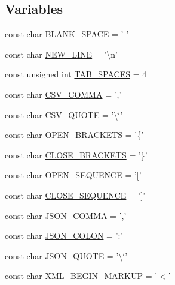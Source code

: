 \subsection*{Variables}
\begin{DoxyCompactItemize}
\item 
const char \hyperlink{namespaceit_1_1testbench_1_1formatter_ae17ec1f53b5ddc40060d493f7d744664}{B\-L\-A\-N\-K\-\_\-\-S\-P\-A\-C\-E} = ' '
\item 
const char \hyperlink{namespaceit_1_1testbench_1_1formatter_a21de1048d5a464b38faa63ba4a94633b}{N\-E\-W\-\_\-\-L\-I\-N\-E} = '\textbackslash{}n'
\item 
const unsigned int \hyperlink{namespaceit_1_1testbench_1_1formatter_a64f8c93e071db6e89ba0c16de961589b}{T\-A\-B\-\_\-\-S\-P\-A\-C\-E\-S} = 4
\item 
const char \hyperlink{namespaceit_1_1testbench_1_1formatter_ada9f2a5b063dec4362e8945321acdb49}{C\-S\-V\-\_\-\-C\-O\-M\-M\-A} = ','
\item 
const char \hyperlink{namespaceit_1_1testbench_1_1formatter_a8bfa4278b48cc7a4296d6888166e1b55}{C\-S\-V\-\_\-\-Q\-U\-O\-T\-E} = '\textbackslash{}\char`\"{}'
\item 
const char \hyperlink{namespaceit_1_1testbench_1_1formatter_aea7cf265be96bf2a6768f75a679b9d2f}{O\-P\-E\-N\-\_\-\-B\-R\-A\-C\-K\-E\-T\-S} = '\{'
\item 
const char \hyperlink{namespaceit_1_1testbench_1_1formatter_a3c0d3e9ddb3ebc20b410ea614a1d6668}{C\-L\-O\-S\-E\-\_\-\-B\-R\-A\-C\-K\-E\-T\-S} = '\}'
\item 
const char \hyperlink{namespaceit_1_1testbench_1_1formatter_a5fce6f0b6a7d8b553fa581680e59b039}{O\-P\-E\-N\-\_\-\-S\-E\-Q\-U\-E\-N\-C\-E} = '\mbox{[}'
\item 
const char \hyperlink{namespaceit_1_1testbench_1_1formatter_af2292cfa9ef9d4b75f19f0249e2c15df}{C\-L\-O\-S\-E\-\_\-\-S\-E\-Q\-U\-E\-N\-C\-E} = '\mbox{]}'
\item 
const char \hyperlink{namespaceit_1_1testbench_1_1formatter_a74d767ae72068425321768cb75b264ce}{J\-S\-O\-N\-\_\-\-C\-O\-M\-M\-A} = ','
\item 
const char \hyperlink{namespaceit_1_1testbench_1_1formatter_a3f9417ec785fb3e3d8cc6ba9e826dc33}{J\-S\-O\-N\-\_\-\-C\-O\-L\-O\-N} = '\-:'
\item 
const char \hyperlink{namespaceit_1_1testbench_1_1formatter_a3bb25faae31114cb273ebe17e9ec4956}{J\-S\-O\-N\-\_\-\-Q\-U\-O\-T\-E} = '\textbackslash{}\char`\"{}'
\item 
const char \hyperlink{namespaceit_1_1testbench_1_1formatter_a073fb47e25b058f3f9a068c500a4beba}{X\-M\-L\-\_\-\-B\-E\-G\-I\-N\-\_\-\-M\-A\-R\-K\-U\-P} = '$<$'

\end{DoxyCompactItemize}
